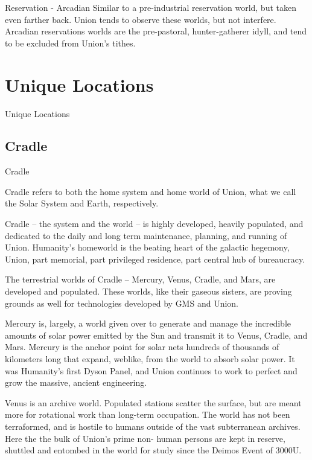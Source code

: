              Reservation - Arcadian               Similar to a pre-industrial reservation world, but taken
                                                  even farther back. Union tends to observe these
                                                  worlds, but not interfere. Arcadian reservations worlds
                                                  are the pre-pastoral, hunter-gatherer idyll, and tend to
                                                  be excluded from Union’s tithes.


\section{Unique Locations}
Unique Locations
\subsection{Cradle}
Cradle




Cradle refers to both the home system and home world of Union, what we call the Solar System
and Earth, respectively.


Cradle -- the system and the world -- is highly developed, heavily populated, and dedicated to
the daily and long term maintenance, planning, and running of Union. Humanity's homeworld is
the beating heart of the galactic hegemony, Union, part memorial, part privileged residence, part
central hub of bureaucracy.


The terrestrial worlds of Cradle -- Mercury, Venus, Cradle, and Mars, are developed and
populated. These worlds, like their gaseous sisters, are proving grounds as well for technologies
developed by GMS and Union.


Mercury is, largely, a world given over to generate and manage the incredible amounts of solar
power emitted by the Sun and transmit it to Venus, Cradle, and Mars. Mercury is the anchor
point for solar nets hundreds of thousands of kilometers long that expand, weblike, from the
world to absorb solar power. It was Humanity’s first Dyson Panel, and Union continues to work to
perfect and grow the massive, ancient engineering.


Venus is an archive world. Populated stations scatter the surface, but are meant more for
rotational work than long-term occupation. The world has not been terraformed, and is hostile to
humans outside of the vast subterranean archives. Here the the bulk of Union’s prime non-
human persons are kept in reserve, shuttled and entombed in the world for study since the
Deimos Event of 3000U.


